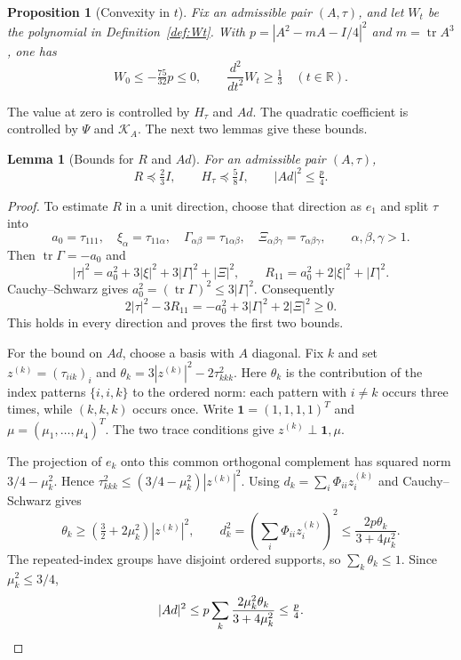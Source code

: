 \documentclass[11pt,a4paper]{amsart}
\numberwithin{equation}{section}
\newtheorem{proposition}[theorem]{Proposition}
\newtheorem{lemma}[theorem]{Lemma}
\theoremstyle{definition}
\theoremstyle{remark}
\DeclareMathOperator{\tr}{tr}
\newcommand{\R}{\mathbb R}
\newcommand{\K}{\mathcal K}
\begin{document}
\begin{proposition}[Convexity in $t$]\label{prop:convex}
Fix an admissible pair $(A,\tau)$, and let $W_t$ be the polynomial
in Definition~\ref{def:Wt}. With $p=|A^2-mA-I/4|^2$ and
$m=\tr A^3$, one has
\begin{equation}\label{eq:Wbounds}
 W_0\le-\tfrac{75}{32}p\le0,\qquad
 \frac{d^2}{dt^2}W_t\ge\tfrac13\quad(t\in\R).
\end{equation}
\end{proposition}

The value at zero is controlled by $H_\tau$ and $Ad$.
The quadratic coefficient is controlled by $\Psi$ and $\K_A$.
The next two lemmas give these bounds.

\begin{lemma}[Bounds for $R$ and $Ad$]\label{lem:bounds}
For an admissible pair $(A,\tau)$,
\begin{equation}\label{eq:bounds}
 R\preceq\tfrac23I,\qquad H_\tau\preceq\tfrac58I,
 \qquad |Ad|^2\le\tfrac p4.
\end{equation}
\end{lemma}
\begin{proof}
To estimate $R$ in a unit direction, choose that direction as $e_1$
and split $\tau$ into
\[
 a_0=\tau_{111},\quad \xi_\alpha=\tau_{11\alpha},\quad
 \Gamma_{\alpha\beta}=\tau_{1\alpha\beta},\quad
 \Xi_{\alpha\beta\gamma}=\tau_{\alpha\beta\gamma},
 \qquad \alpha,\beta,\gamma>1.
\]
Then $\tr\Gamma=-a_0$ and
\[
 |\tau|^2=a_0^2+3|\xi|^2+3|\Gamma|^2+|\Xi|^2,\qquad
 R_{11}=a_0^2+2|\xi|^2+|\Gamma|^2.
\]
Cauchy--Schwarz gives $a_0^2=(\tr\Gamma)^2\le3|\Gamma|^2$.
Consequently
\[
 2|\tau|^2-3R_{11}=-a_0^2+3|\Gamma|^2+2|\Xi|^2\ge0.
\]
This holds in every direction and proves the first two bounds.

For the bound on $Ad$, choose a basis with $A$ diagonal. Fix $k$ and set
$z^{(k)}=(\tau_{iik})_i$ and
$\theta_k=3|z^{(k)}|^2-2\tau_{kkk}^2$.
Here $\theta_k$ is the contribution of the index patterns
$\{i,i,k\}$ to the ordered norm: each pattern with $i\ne k$ occurs
three times, while $(k,k,k)$ occurs once.
Write $\boldsymbol1=(1,1,1,1)^T$ and
$\mu=(\mu_1,\ldots,\mu_4)^T$. The two trace conditions give
$z^{(k)}\perp\boldsymbol1,\mu$.

The projection of $e_k$ onto this common orthogonal complement has
squared norm $3/4-\mu_k^2$. Hence
$\tau_{kkk}^2\le(3/4-\mu_k^2)|z^{(k)}|^2$.
Using $d_k=\sum_i\Phi_{ii}z_i^{(k)}$ and Cauchy--Schwarz gives
\[
 \theta_k\ge(\tfrac32+2\mu_k^2)|z^{(k)}|^2,
 \qquad
 d_k^2=\left(\sum_i\Phi_{ii}z_i^{(k)}\right)^2
       \le\frac{2p\theta_k}{3+4\mu_k^2}.
\]
The repeated-index groups have disjoint ordered supports, so
$\sum_k\theta_k\le1$. Since $\mu_k^2\le3/4$,
\[
 |Ad|^2\le p\sum_k\frac{2\mu_k^2\theta_k}{3+4\mu_k^2}
       \le\tfrac p4.\qedhere
\]

\end{proof}
\end{document}
